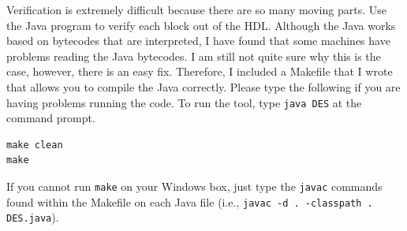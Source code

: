 \documentclass{article}
\begin{document}
Verification is extremely difficult
because there are so many moving parts.  Use the
Java program to verify each block out of the HDL.  Although the Java
works based on bytecodes that are interpreted, I have found that some
machines have problems reading the Java bytecodes.  I am still not
quite sure why this is the case, however, there is an easy fix.
Therefore, I included a
Makefile that I wrote that allows you to compile the Java correctly.
Please type the following if you are having problems running the
code.  To run the tool, type \verb!java DES! at the command prompt.
\begin{verbatim}
make clean
make
\end{verbatim}
If you cannot run \verb!make! on your Windows box, just type the
\verb!javac! commands found within the Makefile on each Java file
(i.e., \verb!javac -d . -classpath . DES.java!).  
\end{document}
